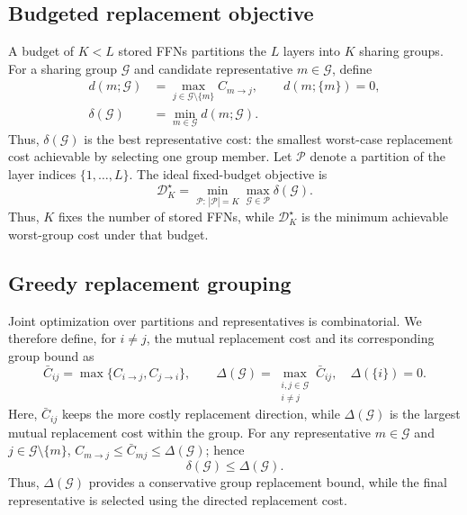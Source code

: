 \documentclass{article}
\begin{document}
\subsection{Budgeted replacement objective}

A budget of $K<L$ stored FFNs partitions the $L$ layers into $K$ sharing
groups. For a sharing group $\mathcal G$ and candidate representative
$m\in\mathcal G$, define
\begin{align}
d(m;\mathcal G)
&=
\max_{j\in\mathcal G\setminus\{m\}} C_{m\to j},
\qquad d(m;\{m\})=0, \nonumber\\[-0.5mm]
\delta(\mathcal G)
&=
\min_{m\in\mathcal G} d(m;\mathcal G).
\label{eq:group-donor}
\end{align}
Thus, $\delta(\mathcal G)$ is the best representative cost: the smallest
worst-case replacement cost achievable by selecting one group member.
Let $\mathcal P$ denote a partition of the layer indices
$\{1,\ldots,L\}$. The ideal fixed-budget objective is
\begin{equation}
\mathcal D_K^\star
=
\min_{\mathcal P:\,|\mathcal P|=K}
\max_{\mathcal G\in\mathcal P}
\delta(\mathcal G).
\label{eq:preservation-objective}
\end{equation}
Thus, $K$ fixes the number of stored FFNs, while $\mathcal D_K^\star$ is the
minimum achievable worst-group cost under that budget.

\subsection{Greedy replacement grouping}

Joint optimization over partitions and representatives is combinatorial.
We therefore define, for $i\neq j$, the mutual replacement cost and its
corresponding group bound as
\begin{equation}
\bar C_{ij}
=
\max\{C_{i\to j},C_{j\to i}\},
\qquad
\Delta(\mathcal G)
=
\max_{\substack{i,j\in\mathcal G\\ i\neq j}}
\bar C_{ij},
\quad
\Delta(\{i\})=0.
\label{eq:group-bound}
\end{equation}
Here, $\bar C_{ij}$ keeps the more costly replacement direction, while
$\Delta(\mathcal G)$ is the largest mutual replacement cost within the group.
For any representative $m\in\mathcal G$ and
$j\in\mathcal G\setminus\{m\}$,
$C_{m\to j}\leq\bar C_{mj}\leq\Delta(\mathcal G)$; hence
\begin{equation}
\delta(\mathcal G)\leq\Delta(\mathcal G).
\label{eq:group-bound-relation}
\end{equation}
Thus, $\Delta(\mathcal G)$ provides a conservative group replacement bound,
while the final representative is selected using the directed replacement cost.
\end{document}
